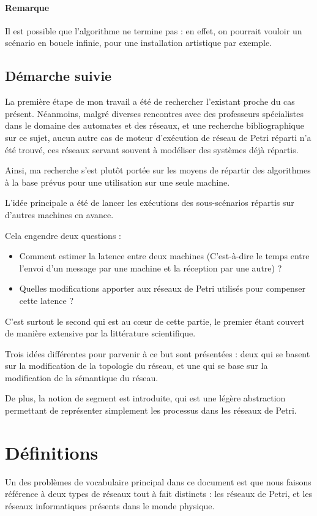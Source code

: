 \paragraph{Remarque} Il est possible que l'algorithme ne termine pas : en effet, on pourrait vouloir un scénario en boucle infinie, pour une installation artistique par exemple.

\subsection{Démarche suivie}
La première étape de mon travail a été de rechercher l'existant proche du cas présent. Néanmoins, malgré diverses rencontres avec des professeurs spécialistes dans le domaine des automates et des réseaux, et une recherche bibliographique sur ce sujet, aucun autre cas de moteur d'exécution de réseau de Petri réparti n'a été trouvé, ces réseaux servant souvent à modéliser des systèmes déjà répartis.

Ainsi, ma recherche s'est plutôt portée sur les moyens de répartir des algorithmes à la base prévus pour une utilisation sur une seule machine. 

L'idée principale a été de lancer les exécutions des sous-scénarios répartis sur d'autres machines en avance.

Cela engendre deux questions : 
\begin{itemize}
\item Comment estimer la latence entre deux machines (C'est-à-dire le temps entre l'envoi d'un message par une machine et la réception par une autre) ? 
\item Quelles modifications apporter aux réseaux de Petri utilisés pour compenser cette latence ?
\end{itemize}

C'est surtout le second qui est au cœur de cette partie, le premier étant couvert de manière extensive par la littérature scientifique.

Trois idées différentes pour parvenir à ce but sont présentées : deux qui se basent sur la modification de la topologie du réseau, et une qui se base sur la modification de la sémantique du réseau.

De plus, la notion de segment est introduite, qui est une légère abstraction permettant de représenter simplement les processus dans les réseaux de Petri.

\section{Définitions}
Un des problèmes de vocabulaire principal dans ce document est que nous faisons référence à deux types de réseaux tout à fait distincts : les réseaux de Petri, et les réseaux informatiques présents dans le monde physique.


